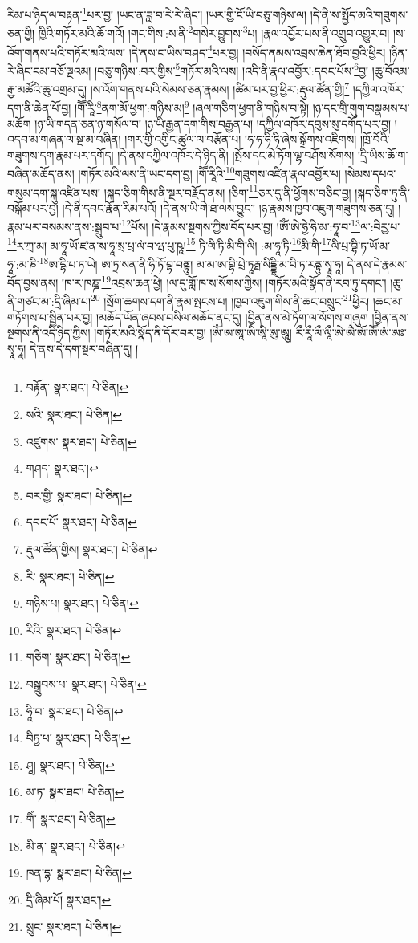 རིམ་པ་ཉིད་ལ་བརྟན་\footnote{བརྟོན་  སྣར་ཐང་།  པེ་ཅིན། }པར་བྱ། །ཡང་ན་ཟླ་བ་རེ་རེ་ཞིང་། །ཡར་གྱི་ངོ་ཡི་བཅུ་གཉིས་ལ། །དེ་ནི་ས་སྤྱོད་མའི་གཟུགས་ཅན་གྱི། ཁྱིའི་གཏོར་མའི་ཆོ་གའོ། །གང་གིས་:ས་ནི་\footnote{སའི་  སྣར་ཐང་།  པེ་ཅིན། }གསེར་བྱུགས་\footnote{འཛུགས་  སྣར་ཐང་།  པེ་ཅིན། }པ། །རྣལ་འབྱོར་པས་ནི་འགྲུབ་འགྱུར་བ། །ས་འོག་གནས་པའི་གཏོར་མའི་ལས། །དེ་ནས་ང་ཡིས་བཤད་\footnote{གཤད་  སྣར་ཐང་། }པར་བྱ། །བསོད་ནམས་འབྲས་ཆེན་ཐོབ་བྱའི་ཕྱིར། །ཉིན་རེ་ཞིང་ངམ་བཅོ་ལྔའམ། །བཅུ་གཉིས་:བར་གྱིས་\footnote{བར་གྱི་  སྣར་ཐང་།  པེ་ཅིན། }གཏོར་མའི་ལས། །འདི་ནི་རྣལ་འབྱོར་:དབང་པོས་\footnote{དབང་པོ་  སྣར་ཐང་།  པེ་ཅིན། }བྱ། །ཆུ་བོའམ་རྒྱ་མཚོའི་ཆུ་འགྲམ་དུ། །ས་འོག་གནས་པའི་སེམས་ཅན་རྣམས། །ཚིམ་པར་བྱ་ཕྱིར་:རྡུལ་ཚོན་གྱི།\footnote{རྡུལ་ཚོན་གྱིས།  སྣར་ཐང་།  པེ་ཅིན། } །དཀྱིལ་འཁོར་དག་ནི་ཆེན་པོ་བྱ། །གཽ་རཱི་\footnote{རི་  སྣར་ཐང་།  པེ་ཅིན། }ནག་མོ་ཕྱག་:གཉིས་མ།\footnote{གཉིས་པ།  སྣར་ཐང་།  པེ་ཅིན། } །ཞལ་གཅིག་ཕྱག་ནི་གཉིས་བ་སྟེ། །ཉ་དང་གྲི་གུག་བསྣམས་པ་མཆོག །ཉ་ཡི་གདན་ཅན་ཉ་གསོལ་བ། །ཉ་ཡི་རྒྱན་དག་གིས་བརྒྱན་པ། །དཀྱིལ་འཁོར་དབུས་སུ་དགོད་པར་བྱ། །འདབ་མ་གཞན་ལ་སྔ་མ་བཞིན། །གར་གྱི་འགྱིང་ཚུལ་ལ་བརྩོན་པ། །ཧ་ཧ་ཧི་ཧི་ཞེས་སྒྲོགས་འཇིགས། །ཁྲོ་བོའི་གཟུགས་དག་རྣམ་པར་དགོད། །དེ་ནས་དཀྱིལ་འཁོར་དེ་ཉིད་ནི། །སྤོས་དང་མེ་ཏོག་ལྷ་བཤོས་སོགས། །དྲི་ཡིས་ཆོ་ག་བཞིན་མཆོད་ནས། །གཏོར་མའི་ལས་ནི་ཡང་དག་བྱ། །གཽ་རཱིའི་\footnote{རིའི་  སྣར་ཐང་།  པེ་ཅིན། }གཟུགས་འཛིན་རྣལ་འབྱོར་པ། །སེམས་དཔའ་གསུམ་དག་སྐུ་འཛིན་པས། །སྐད་ཅིག་གིས་ནི་སྔར་བརྗོད་ནས། །ཅིག་\footnote{གཅིག་  སྣར་ཐང་།  པེ་ཅིན། }ཅར་དུ་ནི་ཕྱོགས་བཅིང་བྱ། །སྐད་ཅིག་ཏུ་ནི་བསྒོམ་པར་བྱ། །དེ་ནི་དབང་རྣོན་རིམ་པའོ། །དེ་ནས་ཡི་གེ་ཐ་ལས་བྱུང་། །ཉ་རྣམས་ཁྱབ་འཇུག་གཟུགས་ཅན་དུ། །རྣམ་པར་བསམས་ནས་:སྒྲུབ་པ་\footnote{བསྒྲུབས་པ་  སྣར་ཐང་།  པེ་ཅིན། }པོས། །དེ་རྣམས་སྔགས་ཀྱིས་བོད་པར་བྱ། །ཨོཾ་ཨེ་ཧྱེ་ཧི་མ་:ཧཱ་བ་\footnote{ཧཱི་བ་  སྣར་ཐང་།  པེ་ཅིན། }ལ་:བིརྱ་པ་\footnote{བིཏྱ་པ་  སྣར་ཐང་།  པེ་ཅིན། }ར་ཀྲ་མ། མ་ཧཱ་ཡོ་ཛ་ན་ས་ཧཱ་སྲ་པྲ་ལཾ་བ་ཝ་པུ་ཥཱ།\footnote{ཤཱ།  སྣར་ཐང་།  པེ་ཅིན། } ཏི་ལི་ཏི་མི་གི་ལི། :མ་ཧཱ་ཏི་\footnote{མ་ཏ་  སྣར་ཐང་།  པེ་ཅིན། }མི་གི་\footnote{གིཾ་  སྣར་ཐང་།  པེ་ཅིན། }ལི་པྲ་བྷི་ཏ་ཡོ་མ་ཧཱ་:མ་ཎི་\footnote{མི་ན་  སྣར་ཐང་།  པེ་ཅིན། }ཨ་དྷི་པ་ཏ་ཡེ། ཨ་ཏྲ་སན་ནི་ཧི་ཏོ་བྷ་བནྟུ། མ་མ་ཨ་བྷི་པྲེ་ཏཱརྠ་སིདྡྷི་མ་བི་ཏ་རནྟུ་སྭཱ་ཧཱ། དེ་ནས་དེ་རྣམས་བོད་བྱས་ནས། །ཁ་ར་ཁཎྜ་\footnote{ཁན་དྷ་  སྣར་ཐང་།  པེ་ཅིན། }འབྲས་ཆན་ཕྱེ། །ལ་དུ་གློ་ཁ་ས་སོགས་ཀྱིས། །གཏོར་མའི་སྣོད་ནི་རབ་ཏུ་དགང་། །ཆུ་ནི་གཙང་མ་:དྲི་ཞིམ་པ།\footnote{དྲི་ཞིམ་པོ།  སྣར་ཐང་། } །སྲོག་ཆགས་དག་ནི་རྣམ་སྤངས་པ། །ཁྱབ་འཇུག་གིས་ནི་ཆང་བསྲུང་\footnote{སྲུང་  སྣར་ཐང་།  པེ་ཅིན། }ཕྱིར། །ཆང་མ་གཏོགས་པ་སྦྱིན་པར་བྱ། །མཆོད་ཡོན་ཞབས་བསིལ་མཆོད་ནང་དུ། །བྱིན་ནས་མེ་ཏོག་ལ་སོགས་གཞུག །བྱིན་ནས་སྔགས་ནི་འདི་ཉིད་ཀྱིས། །གཏོར་མའི་སྣོད་ནི་དོར་བར་བྱ། །ཨོཾ་ཨ་ཨཱ་ཨི་ཨཱི་ཨུ་ཨཱུ། རྀ་རཱྀ་ལྀ་ལཱྀ་ཨེ་ཨཻ་ཨོ་ཨཽ་ཨཾ་ཨཿ་སྭཱ་ཧཱ། དེ་ནས་དེ་དག་སྔར་བཞིན་དུ། །
